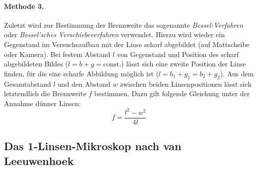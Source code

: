 \documentclass[ngerman]{scrartcl}
\begin{document}
\paragraph{Methode 3.}
Zuletzt wird zur Bestimmung der Brennweite das sogenannte \textit{Bessel-Verfahren} oder \textit{Bessel'sches Verschiebeverfahren} verwendet. Hierzu wird wieder ein Gegenstand im Versuchsaufbau mit der Linse scharf abgebildet (auf Mattscheibe oder Kamera). Bei festem Abstand $l$ von Gegenstand und Position des scharf abgebildeten Bildes ($l = b + g = \text{const.}$) lässt sich eine zweite Position der Linse finden, für die eine scharfe Abbildung möglich ist ($l = b_1 + g_1 = b_2 + g_2$). Aus dem Gesamtabstand $l$ und den Abstand $w$ zwischen beiden Linsenpositionen lässt sich letztendlich die Brennweite $f$ bestimmen. Dazu gilt folgende Gleichung unter der Annahme dünner Linsen:
%
\begin{equation}
    \label{eq:bessel}
    f = \frac{l^2 - w^2}{4 l}
\end{equation}


\subsection{Das 1-Linsen-Mikroskop nach van Leeuwenhoek}
\label{subsec:1_linsen_mikroskop_Grundlagen}
\end{document}

